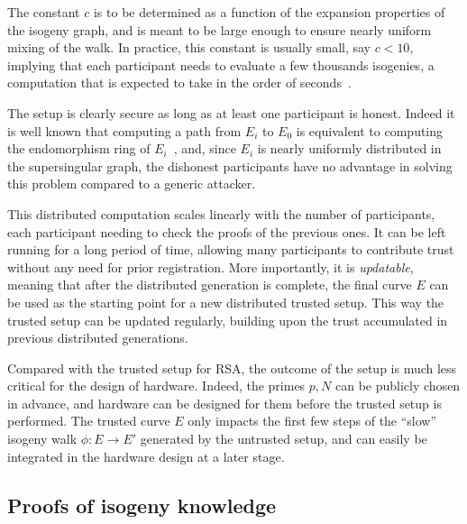 \documentclass{llncs}
\begin{document}
The constant $c$ is to be determined as a function of the expansion
properties of the isogeny graph, and is meant to be large enough to
ensure nearly uniform mixing of the walk. %
In practice, this constant is usually small, say $c<10$, implying that
each participant needs to evaluate a few thousands isogenies, a
computation that is expected to take in the order of
seconds~\cite{10.1007/978-3-030-03332-3_15}.

The setup is clearly secure as long as at least one participant is
honest. %
Indeed it is well known that computing a path from $E_i$ to $E_0$ is
equivalent to computing the endomorphism ring of
$E_i$~\cite{kohel2014quaternion,10.1007/978-3-319-78372-7_11}, and,
since $E_i$ is nearly uniformly distributed in the supersingular graph, the
dishonest participants have no advantage in solving this problem
compared to a generic attacker.

This distributed computation scales linearly with the number of
participants, each participant needing to check the proofs of the
previous ones. %
It can be left running for a long period of time, allowing many
participants to contribute trust without any need for prior
registration. %
More importantly, it is \emph{updatable}, meaning that after the
distributed generation is complete, the final curve $E$ can be used as
the starting point for a new distributed trusted setup. %
This way the trusted setup can be updated regularly, building upon the
trust accumulated in previous distributed generations.

Compared with the trusted setup for RSA, the outcome of the setup is
much less critical for the design of hardware. %
Indeed, the primes $p,N$ can be publicly chosen in advance, and
hardware can be designed for them before the trusted setup is
performed. %
The trusted curve $E$ only impacts the first few steps of the ``slow''
isogeny walk $\phi:E\to E'$ generated by the untrusted setup, and can
easily be integrated in the hardware design at a later stage.

\subsection{Proofs of isogeny knowledge}
\end{document}
